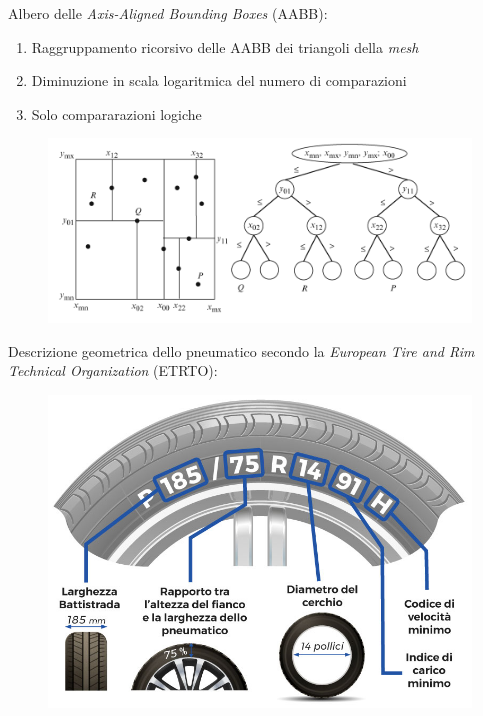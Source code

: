 \documentclass[xcolor=dvipsnames]{beamer} %
\begin{document}
\begin{frame}
	\Large{Albero delle \textit{Axis-Aligned Bounding Boxes} (AABB)}:
	\normalsize
	\begin{enumerate}
		\item Raggruppamento ricorsivo delle AABB dei triangoli della \textit{mesh}
		\item Diminuzione in scala logaritmica del numero di comparazioni
		\item Solo compararazioni logiche
	\end{enumerate}
	\begin{figure}
		\centering
		\includegraphics[width=0.85\linewidth]{../Figures/AABB}
	\end{figure}
\end{frame}

\begin{frame}
	\Large {Descrizione geometrica dello pneumatico secondo la \textit{European Tire and Rim Technical Organization} (ETRTO)}:
	\begin{figure}
		\centering
		\includegraphics[width=0.7\linewidth]{../Figures/tire_measures}
	\end{figure}
\end{frame}
\end{document}
